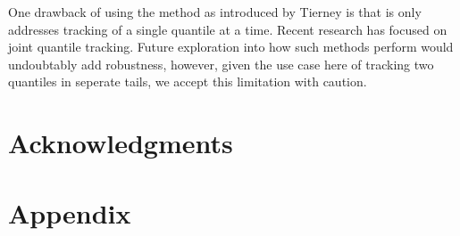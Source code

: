 One drawback of using the method as introduced by Tierney is that is only addresses tracking of a single quantile at a time. Recent research has focused on joint quantile tracking. Future exploration into how such methods perform would undoubtably add robustness, however, given the use case here of tracking two quantiles in seperate tails, we accept this limitation with caution.

\section*{Acknowledgments}

\section*{Appendix}
